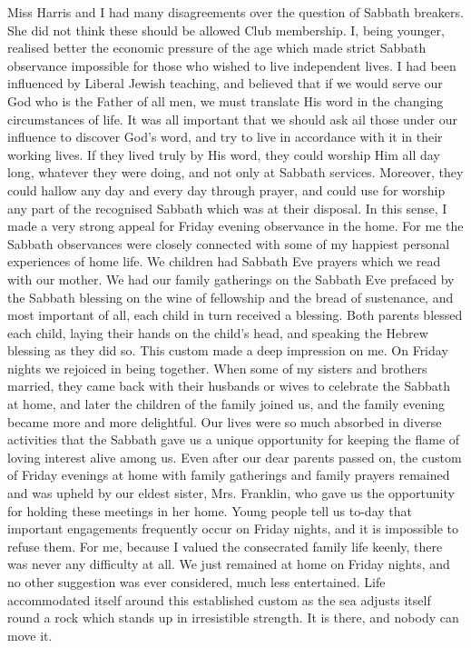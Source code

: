 \documentclass[14pt, article, extrafontsizes, twopage, a4paper]{memoir}
\begin{document}
Miss Harris and I had many disagreements over the
question of Sabbath breakers. She did not think these
should be allowed Club membership. I, being younger,
realised better the economic pressure of the age which
made strict Sabbath observance impossible for those who
wished to live independent lives. I had been influenced
by Liberal Jewish teaching, and believed that if we would
serve our God who is the Father of all men, we must
translate His word in the changing circumstances of life.
It was all important that we should ask ail those under
our influence to discover God’s word, and try to live in
accordance with it in their working lives. If they lived
truly by His word, they could worship Him all day long,
whatever they were doing, and not only at Sabbath services.
Moreover, they could hallow any day and every
day through prayer, and could use for worship any part
of the recognised Sabbath which was at their disposal.
In this sense, I made a very strong appeal for Friday
evening observance in the home. For me the Sabbath
observances were closely connected with some of my
happiest personal experiences of home life. We children
had Sabbath Eve prayers which we read with our
mother. We had our family gatherings on the Sabbath
Eve prefaced by the Sabbath blessing on the wine of
fellowship and the bread of sustenance, and most important
of all, each child in turn received a blessing. Both
parents blessed each child, laying their hands on the
child’s head, and speaking the Hebrew blessing as they did
so. This custom made a deep impression on me. On
Friday nights we rejoiced in being together. When some
of my sisters and brothers married, they came back with
their husbands or wives to celebrate the Sabbath at home,
and later the children of the family joined us, and the
family evening became more and more delightful. Our
lives were so much absorbed in diverse activities that the
Sabbath gave us a unique opportunity for keeping the
flame of loving interest alive among us. Even after our
dear parents passed on, the custom of Friday evenings
at home with family gatherings and family prayers
remained and was upheld by our eldest sister, Mrs.
Franklin, who gave us the opportunity for holding these
meetings in her home. Young people tell us to-day that
important engagements frequently occur on Friday
nights, and it is impossible to refuse them. For me,
because I valued the consecrated family life keenly, there
was never any difficulty at all. We just remained at home
on Friday nights, and no other suggestion was ever considered,
much less entertained. Life accommodated itself
around this established custom as the sea adjusts itself
round a rock which stands up in irresistible strength. It
is there, and nobody can move it.
\end{document}
